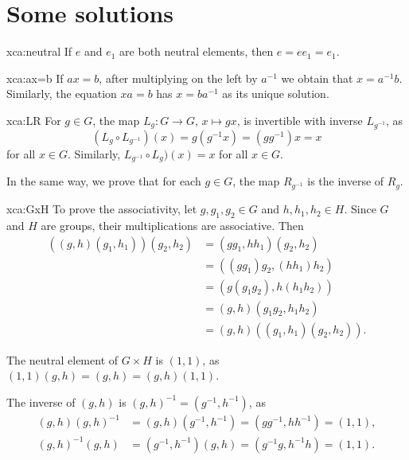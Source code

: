 \section*{Some solutions}

\fancyhf{}
\fancyfoot[R]{\thepage}
\fancyhead[L]{\course}
\setlength{\headheight}{14pt}

\begin{sol}{xca:neutral}
If $e$ and $e_1$ are both neutral elements, then $e=ee_1=e_1$. 
\end{sol}

\begin{sol}{xca:ax=b}
    If $ax=b$, after multiplying on the left by $a^{-1}$ we
    obtain that $x=a^{-1}b$. Similarly, the equation $xa=b$ 
    has $x=ba^{-1}$ as its unique solution. 
\end{sol}

\begin{sol}{xca:LR}
    For $g\in G$, the map $L_g\colon G\to G$, $x\mapsto gx$, is invertible 
    with inverse $L_{g^{-1}}$, as
    \[
    (L_g\circ L_{g^{-1}})(x)=g(g^{-1}x)=(gg^{-1})x=x
    \]
    for all $x\in G$. Similarly, $L_{g^{-1}}\circ L_g)(x)=x$ for all $x\in G$. 
    
    In the same way, we prove that 
    for each $g\in G$, the map $R_{g^{-1}}$ is the inverse of $R_g$. 
\end{sol}

\begin{sol}{xca:GxH}
    To prove the associativity, let $g,g_1,g_2\in G$ and 
    $h,h_1,h_2\in H$. Since $G$ and $H$ are groups, 
    their multiplications are associative. Then 
    \begin{align*}
        ((g,h)(g_1,h_1))(g_2,h_2) &= (gg_1,hh_1)(g_2,h_2)\\
        &=((gg_1)g_2,(hh_1)h_2)\\
        &= (g(g_1g_2),h(h_1h_2))\\
        &= (g,h)(g_1g_2,h_1h_2)\\
        &= (g,h)((g_1,h_1)(g_2,h_2)).
    \end{align*}
    
    The neutral element of $G\times H$ is $(1,1)$, as $(1,1)(g,h)=(g,h)=(g,h)(1,1)$. 
    
    The inverse
    of $(g,h)$ is $(g,h)^{-1}=(g^{-1},h^{-1})$, as
    \begin{align*}
    (g,h)(g,h)^{-1}&=(g,h)(g^{-1},h^{-1})=(gg^{-1},hh^{-1})=(1,1),\\
    (g,h)^{-1}(g,h)&=(g^{-1},h^{-1})(g,h)=(g^{-1}g,h^{-1}h)=(1,1).
    \end{align*}
\end{sol}

